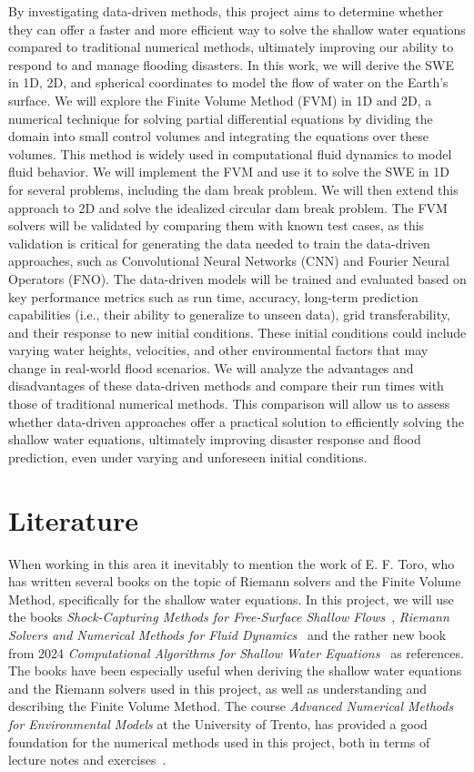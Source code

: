 By investigating data-driven methods, this project aims to determine whether they can offer a faster and more efficient way to solve the shallow water equations compared to traditional numerical methods, ultimately improving our ability to respond to and manage flooding disasters.
In this work, we will derive the SWE in 1D, 2D, and spherical coordinates to model the flow of water on the Earth's surface.
We will explore the Finite Volume Method (FVM) in 1D and 2D, a numerical technique for solving partial differential equations by dividing the domain into small control volumes and integrating the equations over these volumes.
This method is widely used in computational fluid dynamics to model fluid behavior.
We will implement the FVM and use it to solve the SWE in 1D for several problems, including the dam break problem. We will then extend this approach to 2D and solve the idealized circular dam break problem.
The FVM solvers will be validated by comparing them with known test cases, as this validation is critical for generating the data needed to train the data-driven approaches, such as Convolutional Neural Networks (CNN) and Fourier Neural Operators (FNO).
The data-driven models will be trained and evaluated based on key performance metrics such as run time, accuracy, long-term prediction capabilities (i.e., their ability to generalize to unseen data), grid transferability, and their response to new initial conditions.
These initial conditions could include varying water heights, velocities, and other environmental factors that may change in real-world flood scenarios.
We will analyze the advantages and disadvantages of these data-driven methods and compare their run times with those of traditional numerical methods.
This comparison will allow us to assess whether data-driven approaches offer a practical solution to efficiently solving the shallow water equations, ultimately improving disaster response and flood prediction, even under varying and unforeseen initial conditions.

\section{Literature}
When working in this area it inevitably to mention the work of E. F. Toro, who has written several books on the topic of Riemann solvers and the Finite Volume Method, specifically for the shallow water equations.
In this project, we will use the books \textit{Shock-Capturing Methods for Free-Surface Shallow Flows}~\cite{Toro2001-Shock}, \textit{Riemann Solvers and Numerical Methods for Fluid Dynamics}~\cite{Toro2009-Riemann} and the rather new book from 2024 \textit{Computational Algorithms for Shallow Water Equations}~\cite{Toro2024} as references.
The books have been especially useful when deriving the shallow water equations and the Riemann solvers used in this project, as well as understanding and describing the Finite Volume Method.
The course \textit{Advanced Numerical Methods for Environmental Models} at the University of Trento, has provided a good foundation for the numerical methods used in this project, both in terms of lecture notes and exercises~\cite{trento_course}.

